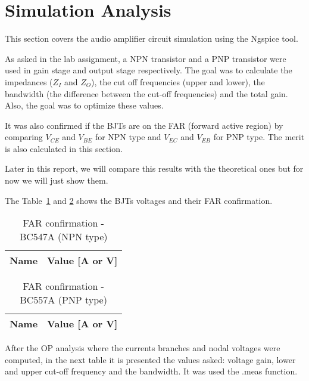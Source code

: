 \section{Simulation Analysis}
\label{sec:simulation}

\hspace{0,5cm} This section covers the audio amplifier circuit simulation using the Ngspice tool.
\par As asked in the lab assignment, a NPN transistor and a PNP transistor were used in gain stage and output stage respectively. The goal was to calculate the impedances ($Z_I$ and $Z_O$), the cut off frequencies (upper and lower), the bandwidth (the difference between the cut-off frequencies) and the total gain. Also, the goal was to optimize these values.
\par It was also confirmed if the BJTs are on the FAR (forward active region) by comparing $V_{CE}$ and $V_{BE}$ for NPN type and $V_{EC}$ and $V_{EB}$ for PNP type. The merit is also calculated in this section.
\par Later in this report, we will compare this results with the theoretical ones but for now we will just show them.

\par The Table~\ref{tab:ng2} and \ref{tab:ng3} shows the BJTs voltages and their FAR confirmation.

\begin{table}[!ht]
  \centering
  \begin{tabular}{|l|r|}
    \hline    
    {\bf Name} & {\bf Value [A or V]} \\ \hline
    
  \end{tabular}
  \caption{FAR confirmation - BC547A (NPN type)}
  \label{tab:ng2}
\end{table}

\begin{table}[!ht]
  \centering
  \begin{tabular}{|l|r|}
    \hline    
    {\bf Name} & {\bf Value [A or V]} \\ \hline
    
  \end{tabular}
  \caption{FAR confirmation - BC557A (PNP type)}
  \label{tab:ng3}
\end{table}

\par After the OP analysis where the currents branches and nodal voltages were computed, in the next table it is presented the values asked: voltage gain, lower and upper cut-off frequency and the bandwidth. It was used the .meas function.

